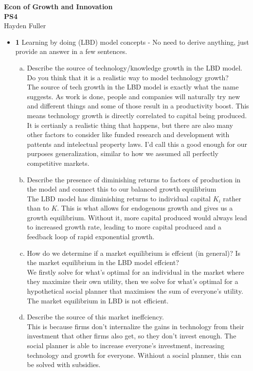 \documentclass[11pt]{article}
\begin{document}
\thispagestyle{empty}   %

\begin{center}
\large
\textbf{Econ of Growth and Innovation \\
PS4}
\\Hayden Fuller
\end{center}

\begin{itemize}

\item \textbf{1} 
Learning by doing (LBD) model concepts - No need to derive anything, just provide
an answer in a few sentences.
\begin{enumerate}[(a)]
\item Describe the source of technology/knowledge growth in the LBD model. Do you think that it is a realistic way to model technology growth?
\\The source of tech growth in the LBD model is exactly what the name suggests. As work is done, people and companies will naturally try new and different things and some of those result in a productivity boost. This means technology growth is directly correlated to capital being produced.
\\It is certianly a realistic thing that happens, but there are also many other factors to consider like funded research and development with pattents and intelectual property laws. I'd call this a good enough for our purposes generalization, similar to how we assumed all perfectly competitive markets.
\item Describe the presence of diminishing returns to factors of production in the model and connect this to our balanced growth equilibrium
\\The LBD model has diminishing returns to individual capital $K_i$ rather than to $K$. This is what allows for endogenous growth and gives us a growth equilibrium. Without it, more capital produced would always lead to increased growth rate, leading to more capital produced and a feedback loop of rapid exponential growth.
\item How do we determine if a market equilibrium is effcient (in general)? Is the market equilibrium in the LBD model effcient?
\\We firstly solve for what's optimal for an individual in the market where they maximize their own utility, then we solve for what's optimal for a hypothetical social planner that maximises the sum of everyone's utility. The market equilibrium in LBD is not efficient.
\item Describe the source of this market ineffciency.
\\This is because firms don't internalize the gains in technology from their investment that other firms also get, so they don't invest enough. The social planner is able to increase everyone's investment, increasing technology and growth for everyone. Withiout a social planner, this can be solved with subsidies.
\end{enumerate}



\end{itemize}
\end{document}
